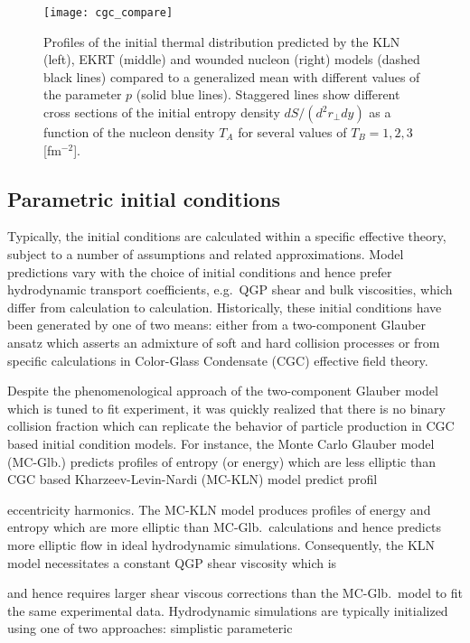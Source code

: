\documentclass[aps,prc,reprint,amsmath]{revtex4-1}
\begin{document}
\begin{figure*}
    \texttt{[image: cgc\_compare]}
    \caption{Profiles of the initial thermal distribution predicted by the KLN (left), EKRT (middle) and wounded nucleon (right) models (dashed black lines) compared to a generalized mean with different values of the parameter $p$ (solid blue lines). Staggered lines show different cross sections of the initial entropy density $dS/(d^2r_\perp dy)$ as a function of the nucleon density $T_A$ for several values of $T_B = 1, 2, 3$ [fm$^{-2}$].} 
\end{figure*}

\subsection{Parametric initial conditions}

Typically, the initial conditions are calculated within a specific effective theory, subject to a number of assumptions and related approximations. Model predictions vary with the choice of initial conditions and hence prefer hydrodynamic transport coefficients, e.g.\ QGP shear and bulk viscosities, which differ from calculation to calculation.
Historically, these initial conditions have been generated by one of two means: either from a two-component Glauber ansatz which asserts an admixture of soft and hard collision processes or from specific calculations in Color-Glass Condensate (CGC) effective field theory. 


Despite the phenomenological approach of the two-component Glauber model which is tuned to fit experiment, it was quickly realized that there is no binary collision fraction which can replicate the behavior of particle production in CGC based initial condition models. For instance, the Monte Carlo Glauber model (MC-Glb.) predicts profiles of entropy (or energy) which are less elliptic than CGC based Kharzeev-Levin-Nardi (MC-KLN) model predict profil


eccentricity harmonics. The MC-KLN model produces profiles of energy and entropy which are more elliptic than MC-Glb.\ calculations and hence predicts more elliptic flow in ideal hydrodynamic simulations. Consequently, the KLN model necessitates a constant QGP shear viscosity which is

 and hence requires larger shear viscous corrections than the MC-Glb.\ model to fit the same experimental data.
Hydrodynamic simulations are typically initialized using one of two approaches: simplistic parameteric
\end{document}
